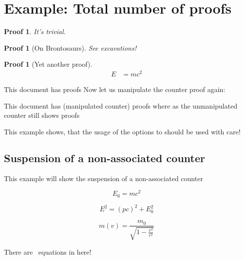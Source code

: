 \documentclass[12pt,paper=a4]{article}
\begin{document}
\section[Total number of proofs]{Example: Total number of proofs}


\begin{dispExample}
%
%
\newtheorem{Proof}[proof]{Proof}%
\begin{Proof}
It's trivial.   
\end{Proof}

\begin{Proof}[On Brontosaurs]
See excavations!
\end{Proof}

\setcounter{proof}{17}

\begin{Proof}[Yet another proof]
\begin{align*}
  E &= m c^2
  \end{align*}
\end{Proof}

This document has \number\value{anotherproofcounter} proofs %
Now let us manipulate the counter proof again:
\setcounter[AssociatedCounters={totalproofs}]{proof}{200}

This document has \number{} (manipulated counter) proofs where as the unmanipulated counter still shows \number\value{anotherproofcounter} proofs %
\end{dispExample}

This example shows, that the usage of the options to  should be used with care!


\subsection{Suspension of a non-associated counter}
This example will show the suspension of a non-associated counter


\begin{dispExample}
\setcounter{equation}{0}%
%
\begin{equation}
E_{0} = mc^2
\end{equation}

\begin{equation}
E^2 = \left({ pc}\right)^2 + E^{2}_{0}
\end{equation}

\begin{equation}
  m(v) = \frac{m_{0}}{\sqrt{1-\frac{v^2}{c^2}}} 
\end{equation}


There are \number\value{equation}~equations in here!
\end{dispExample}


\clearpage


\printindex
\end{document}
